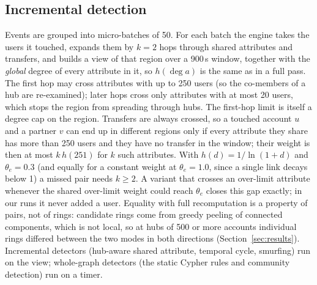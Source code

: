 \subsection{Incremental detection}
Events are grouped into micro-batches of 50. For each batch the engine takes
the users it touched, expands them by $k=2$ hops through shared attributes and
transfers, and builds a view of that region over a 900\,s window, together with
the \emph{global} degree of every attribute in it, so $h(\deg a)$ is the same as
in a full pass. The first hop may cross attributes with up to 250 users (so the
co-members of a hub are re-examined); later hops cross only attributes with at
most 20 users, which stops the region from spreading through hubs. The first-hop
limit is itself a degree cap on the region. Transfers are always crossed, so a
touched account $u$ and a partner $v$ can end up in different regions only if
every attribute they share has more than 250 users and they have no transfer in
the window; their weight is then at most $k\,h(251)$ for $k$ such attributes.
With $h(d)=1/\ln(1+d)$ and $\theta_e=0.3$ (and equally for a constant weight at
$\theta_e=1.0$, since a single link decays below 1) a missed pair needs $k\ge2$.
A variant that crosses an over-limit attribute whenever the shared over-limit
weight could reach $\theta_e$ closes this gap exactly; in our runs it never
added a user. Equality with full recomputation is a property of pairs, not of
rings: candidate rings come from greedy peeling of connected components, which
is not local, so at hubs of 500 or more accounts individual rings differed
between the two modes in both directions (Section~\ref{sec:results}). Incremental
detectors (hub-aware shared attribute, temporal cycle, smurfing) run on the
view; whole-graph detectors (the static Cypher rules and community detection)
run on a timer.

